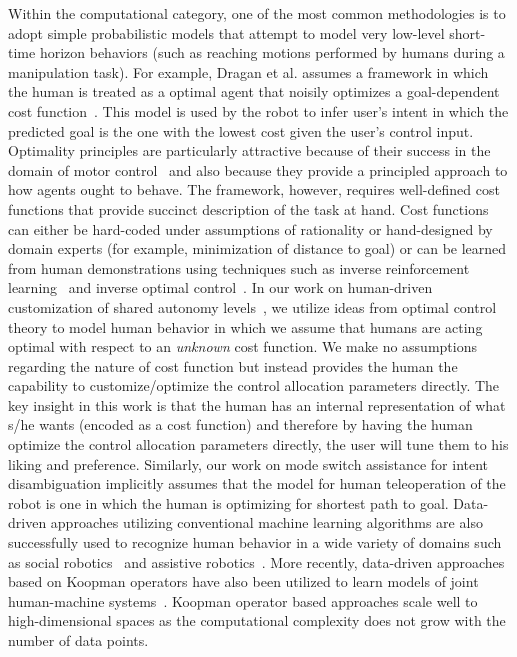 \documentclass[12pt]{article}
\begin{document}
Within the computational category, one of the most common methodologies is to adopt simple probabilistic models that attempt to model very low-level short-time horizon behaviors (such as reaching motions performed by humans during a manipulation task). For example, Dragan et al. assumes a framework in which the human is treated as a optimal agent that noisily optimizes a goal-dependent cost function~\cite{dragan2013policy}. This model is used by the robot to infer user's intent in which the predicted goal is the one with the lowest cost given the user's control input. Optimality principles are particularly attractive because of their success in the domain of motor control~\cite{uno1989formation} and also because they provide a principled approach to how agents ought to behave. The framework, however, requires well-defined cost functions that provide succinct description of the task at hand. Cost functions can either be hard-coded under assumptions of rationality or hand-designed by domain experts (for example, minimization of distance to goal) or can be learned from human demonstrations using techniques such as inverse reinforcement learning~\cite{ziebart2008maximum} and inverse optimal control~\cite{dvijotham2010inverse}. In our work on human-driven customization of shared autonomy levels~\cite{gopinath2017human}, we utilize ideas from optimal control theory to model human behavior in which we assume that humans are acting optimal with respect to an \textit{unknown} cost function. We make no assumptions regarding the nature of cost function but instead provides the human the capability to customize/optimize the control allocation parameters directly. The key insight in this work is that the human has an internal representation of what s/he wants (encoded as a cost function) and therefore by having the human optimize the control allocation parameters directly, the user will tune them to his liking and preference. Similarly, our work on mode switch assistance for intent disambiguation implicitly assumes that the model for human teleoperation of the robot is one in which the human is optimizing for shortest path to goal.
Data-driven approaches utilizing conventional machine learning algorithms are also successfully used to recognize human behavior in a wide variety of domains such as social robotics~\cite{mataric2007socially} and assistive robotics~\cite{goil2013using}. More recently, data-driven approaches based on Koopman operators have also been utilized to learn models of joint human-machine systems~\cite{broad2018learning}. Koopman operator based approaches scale well to high-dimensional spaces as the computational complexity does not grow with the number of data points. 
\end{document}
